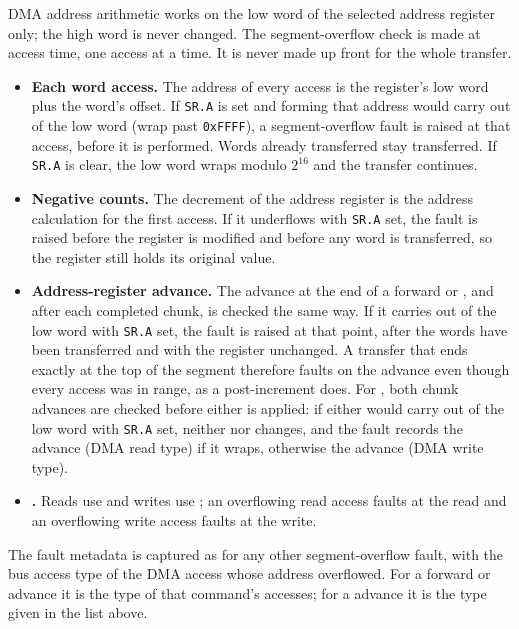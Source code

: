 DMA address arithmetic works on the low word of the selected address register only; the high word is never changed. The
segment-overflow check is made at access time, one access at a time. It is never made up front for the whole transfer.

\begin{itemize}
	\item \textbf{Each word access.} The address of every access is the register's low word plus the word's offset. If
	      \texttt{SR.A} is set and forming that address would carry out of the low word (wrap past \texttt{0xFFFF}), a
	      segment-overflow fault is raised at that access, before it is performed. Words already transferred stay
	      transferred. If \texttt{SR.A} is clear, the low word wraps modulo $2^{16}$ and the transfer continues.
	\item \textbf{Negative counts.} The decrement of the address register is the address calculation for the first
	      access. If it underflows with \texttt{SR.A} set, the fault is raised before the register is modified and before any
	      word is transferred, so the register still holds its original value.
	\item \textbf{Address-register advance.} The advance at the end of a forward  or , and
	      after each completed  chunk, is checked the same way. If it carries out of the low word with
	      \texttt{SR.A} set, the fault is raised at that point, after the words have been transferred and with the
	      register unchanged. A transfer that ends exactly at the top of the segment therefore faults on the advance even
	      though every access was in range, as a post-increment  does. For , both chunk advances
	      are checked before either is applied: if either would carry out of the low word with \texttt{SR.A} set, neither
	       nor  changes, and the fault records the  advance (DMA read type) if it wraps, otherwise
	      the  advance (DMA write type).
	\item \textbf{.} Reads use  and writes use ; an overflowing read access faults at the read
	      and an overflowing write access faults at the write.
\end{itemize}

The fault metadata is captured as for any other segment-overflow fault, with the bus access type of the DMA access
whose address overflowed. For a forward  or  advance it is the type of that command's
accesses; for a  advance it is the type given in the list above.

